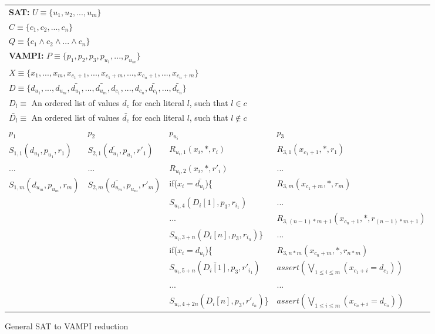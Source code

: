 \begin{figure*}
\begin{center}
\setlength{\tabcolsep}{2pt}
\begin{tabular}[t]{|llll|}
\hline
\multicolumn{4}{|l|}{\textbf{SAT:} $\mathit{U\equiv\{u_1,u_2,...,u_m\}}$}\\
              \multicolumn{4}{|l|}{$\mathit{C\equiv\{c_1,c_2,...,c_n\}}$}\\
              \multicolumn{4}{|l|}{$\mathit{Q\equiv\{c_1\wedge c_2\wedge ...\wedge c_n\}}$}\\
\hline
\multicolumn{4}{|l|}{\textbf{VAMPI:} $\mathit{P\equiv\{p_1,p_2,p_3,p_{u_1},...,p_{u_m}\}}$}\\
                \multicolumn{4}{|l|}{$\mathit{X\equiv\{x_1,...,x_m,x_{c_1+1},...,x_{c_1+m},...,x_{c_n+1},...,x_{c_n+m}\}}$}\\
                \multicolumn{4}{|l|}{$\mathit{D\equiv\{d_{u_1},...,d_{u_m},\bar{d_{u_1}},...,\bar{d_{u_m}},d_{c_1},...,d_{c_n},\bar{d_{c_1}},...,\bar{d_{c_n}}\}}$}\\
                \multicolumn{4}{|l|}{$\mathit{D_l\equiv}$ An ordered list of values $\mathit{d_c}$ for each literal $\mathit{l}$, such that $\mathit{l\in c}$}\\
                \multicolumn{4}{|l|}{$\mathit{\bar{D_l}\equiv}$ An ordered list of values $\mathit{\bar{d_c}}$ for each literal $\mathit{l}$, such that $\mathit{l\notin c}$}\\
$p_1$&$p_2$&$p_{u_i}$&$p_3$\\
\hline
$S_{1,1}(d_{u_1},p_{u_1},r_1)$&$S_{2,1}(\bar{d_{u_1}},p_{u_1},r'_1)$&$R_{u_i,1}(x_i,*,r_i)$&$R_{3,1}(x_{c_1+1},*,r_1)$\\
...&...&$R_{u_i,2}(x_i,*,r'_i)$&...\\
$S_{1,m}(d_{u_m},p_{u_m},r_m)$&$S_{2,m}(\bar{d_{u_m}},p_{u_m},r'_m)$&if($x_i=\bar{d_{u_i}}$)\{&$R_{3,m}(x_{c_1+m},*,r_m)$\\
&&$S_{u_i,4}(D_i[1],p_3,r_{i_1})$&...\\
&&...&$R_{3,(n-1)*m+1}(x_{c_n+1},*,r_{(n-1)*m+1})$\\
&&$S_{u_i,3+n}(D_i[n],p_3,r_{i_n})$\}&...\\
&&if($x_i=d_{u_i}$)\{&$R_{3,n*m}(x_{c_n+m},*,r_{n*m})$\\
&&$S_{u_i,5+n}(\bar{D_i[1]},p_3,r'_{i_1})$&$\mathit{assert}(\bigvee_{1\leq i\leq m}(x_{c_1+i}=d_{c_1}))$\\
&&...&...\\
&&$S_{u_i,4+2n}(\bar{D_i[n]},p_3,r'_{i_n})$\}&$\mathit{assert}(\bigvee_{1\leq i\leq m}(x_{c_n+i}=d_{c_n}))$\\
\hline
\end{tabular}
\end{center}
\caption{General SAT to VAMPI reduction}
\label{fig:vampi}
\end{figure*}